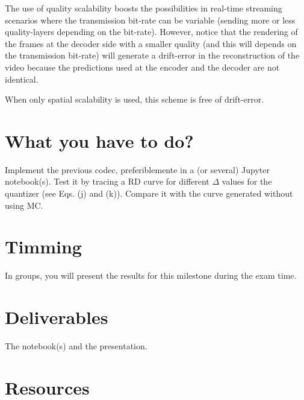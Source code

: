 The use of quality scalability boosts the possibilities in real-time
streaming scenarios where the transmission bit-rate can be variable
(sending more or less quality-layers depending on the
bit-rate). However, notice that the rendering of the
frames at the decoder side with a smaller quality (and this will
depends on the transmission bit-rate) will generate a drift-error in
the reconstruction of the video because the predictions used at the
encoder and the decoder are not identical.

When only spatial scalability is used, this scheme is free of
drift-error.

\section{What you have to do?}

Implement the previous codec, preferiblemente in a (or several)
Jupyter notebook(s). Test it by tracing a RD curve for different
$\Delta$ values for the quantizer (see Eqs. (j) and (k)). Compare it
with the curve generated without using MC.

\section{Timming}

In groups, you will present the results for this milestone during the
exam time.

\section{Deliverables}

The notebook(s) and the presentation.

\section{Resources}

\renewcommand{\addcontentsline}[3]{}%

